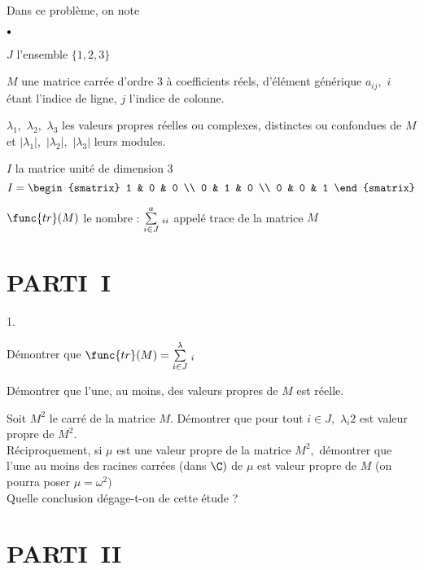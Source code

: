 \documentclass[11pt]{article}%
\begin{document}
\noindent Dans ce problème, on note 

\begin{noliste}{$\scriptstyle \bullet$}
\item $J$ l'ensemble $\{1,2,3\}$

\item $M$ une matrice carrée d'ordre $3$ à coefficients réels,
d'élément générique $a_{ij},$ $i$ étant l'indice de ligne, $j$ l'indice
de colonne.

\item $\lambda_{1},$ $\lambda_{2},$ $\lambda_{3}$ les valeurs propres
réelles ou complexes, distinctes ou confondues de $M$ et $\left|
\lambda
_{1}\right|,$ $\left| \lambda_{2}\right|,$ $\left|
\lambda_{3}\right| $ leurs modules.

\item $I$ la matrice unité de dimension 3
\[
I = 
\begin{smatrix}
1 & 0 & 0 \\
0 & 1 & 0 \\
0 & 0 & 1
\end{smatrix}
\]

\item $\func{tr}(M)$ le nombre : ${\textstyle\sum\limits_{i\in J}^{a}}\hspace{.1cm}_{ii}$ appelé trace
de la matrice $M$
\end{noliste}

\section*{PARTI\E\ I}

\begin{noliste}{1.}
 \setlength{\itemsep}{4mm}
\item Démontrer que $\func{tr}(M) = \Sum{i\in J}\lambda_{i}$

\item Démontrer que l'une, au moins, des valeurs propres de $M$ est
réelle.

\item Soit $M^{2}$ le carré de la matrice $M.$ Démontrer que pour tout
$i\in
J,$ $\lambda_{i}{2}$ est valeur propre de $M^{2}.$\\
Réciproquement, si $\mu $ est une valeur propre de la matrice $M^{2},$
démontrer que l'une au moins des racines carrées (dans $\C)$ de $\mu $
est valeur propre de $M$ (on pourra poser $\mu = \omega ^{2})$\\
Quelle conclusion dégage-t-on de cette étude ?
\end{noliste}

\section*{PARTI\E\ II}
\end{document}
